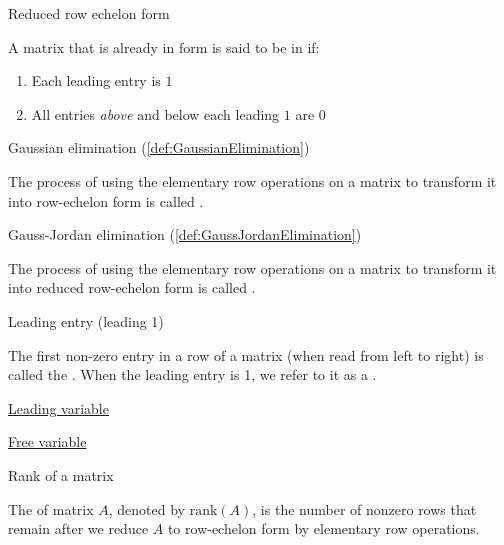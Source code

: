 \documentclass{ximera}
\begin{document}
Reduced row echelon form
\begin{expandable}
    A matrix that is already in  form is said to be in  if:
\begin{enumerate}
\item Each leading entry is $1$
\item All entries {\it above} and below each leading $1$ are $0$
\end{enumerate}
\end{expandable}

Gaussian elimination (\ref{def:GaussianElimination})
\begin{expandable}
    The process of using the elementary row operations on a matrix to transform it into row-echelon form is called .
\end{expandable}

Gauss-Jordan elimination (\ref{def:GaussJordanElimination})
\begin{expandable}
    The process of using the elementary row operations on a matrix to transform it into reduced row-echelon form is called .
\end{expandable}

Leading entry (leading 1)
\begin{expandable}
    The first non-zero entry in a row of a matrix (when read from left to right) is called the .  When the leading entry is 1, we refer to it as a .
\end{expandable}

\href{https://ximera.osu.edu/oerlinalg/LinearAlgebra/SYS-0020/main}{Leading variable}

\href{https://ximera.osu.edu/oerlinalg/LinearAlgebra/SYS-0020/main}{Free variable}

Rank of a matrix
\begin{expandable}
    The  of matrix $A$, denoted by $\mbox{rank}(A)$, is the number of nonzero rows that remain after we reduce $A$ to row-echelon form by elementary row operations.
\end{expandable}
\end{document}
